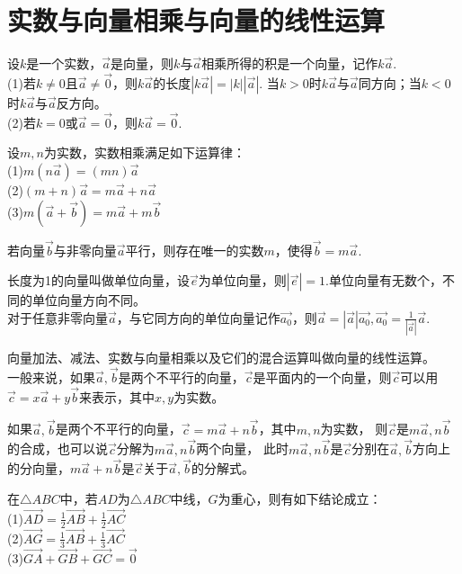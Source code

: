\documentclass{ecnuthesis}
\begin{document}
\section{实数与向量相乘与向量的线性运算}
\begin{knowledge}
    设$k$是一个实数，$\vec{a}$是向量，则$k$与$\vec{a}$相乘所得的积是一个向量，记作$k\vec{a}$. \\
    (1)若$k \ne 0$且$\vec{a}\ne \vec{0}$，则$k\vec{a}$的长度$|k\vec{a}|=|k||\vec{a}|$.
    当$k>0$时$k\vec{a}$与$\vec{a}$同方向；当$k<0$时$k\vec{a}$与$\vec{a}$反方向。 \\
    (2)若$k = 0$或$\vec{a}=\vec{0}$，则$k\vec{a}=\vec{0}$.
\end{knowledge}
\begin{knowledge}
    设$m,n$为实数，实数相乘满足如下运算律：\\
    (1)$m(n\vec{a})=(mn)\vec{a}$ \\
    (2)$(m+n)\vec{a}=m\vec{a}+n\vec{a}$ \\
    (3)$m(\vec{a}+\vec{b})=m\vec{a}+m\vec{b}$
\end{knowledge}
\begin{knowledge}
    若向量$\vec{b}$与非零向量$\vec{a}$平行，则存在唯一的实数$m$，使得$\vec{b}=m\vec{a}$.
\end{knowledge}
\begin{knowledge}
    长度为1的向量叫做单位向量，设$\vec{e}$为单位向量，则$|\vec{e}|=1$.单位向量有无数个，不同的单位向量方向不同。\\
    对于任意非零向量$\vec{a}$，与它同方向的单位向量记作$\vec{a_0}$，则$\vec{a}=|\vec{a}|\vec{a_0},\vec{a_0}=\frac{1}{|\vec{a}|}\vec{a}$.
\end{knowledge}
\begin{knowledge}
    向量加法、减法、实数与向量相乘以及它们的混合运算叫做向量的线性运算。\\
    一般来说，如果$\vec{a},\vec{b}$是两个不平行的向量，$\vec{c}$是平面内的一个向量，则$\vec{c}$可以用$\vec{c}=x\vec{a}+y\vec{b}$来表示，其中$x,y$为实数。
\end{knowledge}
\begin{knowledge}
    如果$\vec{a},\vec{b}$是两个不平行的向量，$\vec{c}=m\vec{a}+n\vec{b}$，其中$m,n$为实数，
    则$\vec{c}$是$m\vec{a},n\vec{b}$的合成，也可以说$\vec{c}$分解为$m\vec{a},n\vec{b}$两个向量，
    此时$m\vec{a},n\vec{b}$是$\vec{c}$分别在$\vec{a},\vec{b}$方向上的分向量，$m\vec{a}+n\vec{b}$是$\vec{c}$关于$\vec{a},\vec{b}$的分解式。
\end{knowledge}
\begin{knowledge}
    在$\triangle ABC$中，若$AD$为$\triangle ABC$中线，$G$为重心，则有如下结论成立：\\
    (1)$\overrightarrow{AD}=\frac{1}{2}\overrightarrow{AB}+\frac{1}{2}\overrightarrow{AC}$ \\
    (2)$\overrightarrow{AG}=\frac{1}{3}\overrightarrow{AB}+\frac{1}{3}\overrightarrow{AC}$ \\
    (3)$\overrightarrow{GA}+\overrightarrow{GB}+\overrightarrow{GC}=\vec{0}$
\end{knowledge}
\clearpage
\end{document}
